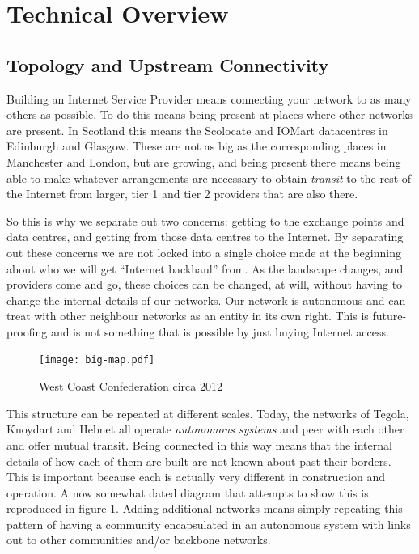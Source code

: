 \section{Technical Overview}

\subsection{Topology and Upstream Connectivity}

Building an Internet Service Provider means connecting your network to
as many others as possible. To do this means being present at places
where other networks are present. In Scotland this means the Scolocate
and IOMart datacentres in Edinburgh and Glasgow. These are not as big as
the corresponding places in Manchester and London, but are growing,
and being present there means being able to make whatever arrangements
are necessary to obtain \textit{transit} to the rest of the Internet
from larger, tier 1 and tier 2 providers that are also there.

So this is why we separate out two concerns: getting to the exchange
points and data centres, and getting from those data centres to the
Internet. By separating out these concerns we are not locked into a
single choice made at the beginning about who we will get ``Internet
backhaul'' from. As the landscape changes, and providers come and go,
these choices can be changed, at will, without having to change the
internal details of our networks. Our network is autonomous and can
treat with other neighbour networks as an entity in its own
right. This is future-proofing and is not something that is possible
by just buying Internet access.

\begin{figure}
  \begin{center}
    \texttt{[image: big-map.pdf]}
  \end{center}
  \caption{West Coast Confederation circa 2012}
  \label{fig:big_map}
\end{figure}

This structure can be repeated at different scales. Today, the
networks of Tegola, Knoydart and Hebnet all operate \textit{autonomous
  systems} and peer with each other and offer mutual transit. Being
connected in this way means that the internal details of how each of
them are built are not known about past their borders. This is
important because each is actually very different in construction and
operation. A now somewhat dated diagram that attempts to show this is
reproduced in figure \ref{fig:big_map}. Adding additional networks
means simply repeating this pattern of having a community encapsulated
in an autonomous system with links out to other communities and/or
backbone networks.

